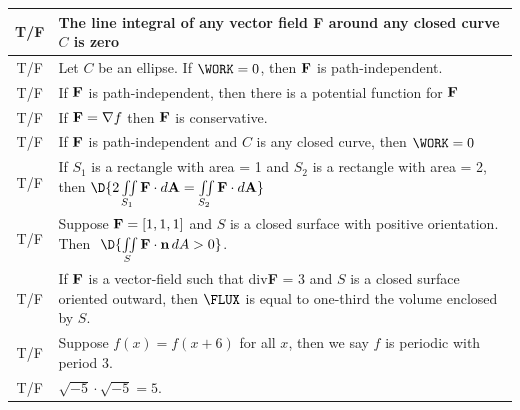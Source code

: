 \documentclass[12pt]{amsart}
\numberwithin{equation}{section}
\begin{document}
	{\setlength{\extrarowheight}{0.5cm}
	\begin{tabular}{| c | p{17.2cm} |}
		\hline
		T\quad/\quad F & The line integral of any vector field {\bf F} around any closed curve $C$ is zero\\
		\hline
		T\quad/\quad F & Let $C$ be an ellipse. If $\WORK = 0$, then ${\bf F}$ is path-independent.\\
		\hline
		T\quad/\quad F & If ${\bf F}$ is path-independent, then there is a potential function for ${\bf F}$\\
		\hline
		T\quad/\quad F & If ${\bf F} = \nabla f$ then ${\bf F}$ is conservative.\\
		\hline
		T\quad/\quad F & If ${\bf F}$ is path-independent and $C$ is any closed curve, then $\WORK = 0$\\
		\hline
		T\quad/\quad F & If $S_1$ is a rectangle with area = 1 and $S_2$ is a rectangle with area = 2, then
$\D{2\iint \limits_{S_1} {\bf F} \cdot d{\bf A} = \iint \limits_{S_2} {\bf F} \cdot d{\bf A}}$\\
		\hline
		T\quad/\quad F & Suppose $\text{\text{\bf F}} = [1,1,1]$ and $S$ is a closed surface with positive orientation.  Then \,\,$\D{\iint \limits_{S} \text{\bf F}\cdot \text{\bf n} \, dA > 0}$.\\
		\hline
		T\quad/\quad F & If ${\bf F}$ is a vector-field such that div{\bf F} = 3 and $S$ is a closed surface oriented outward, then $\FLUX$ is equal to one-third the volume enclosed by $S$.\\
		\hline
		T\quad/\quad F & Suppose $f(x) = f(x+6)$ for all $x$, then we say $f$ is periodic with period 3.\\
		\hline
		T\quad/\quad F & $\sqrt{-5}\cdot\sqrt{-5} = 5$.\\
		\hline
	\end{tabular}}
\end{document}
